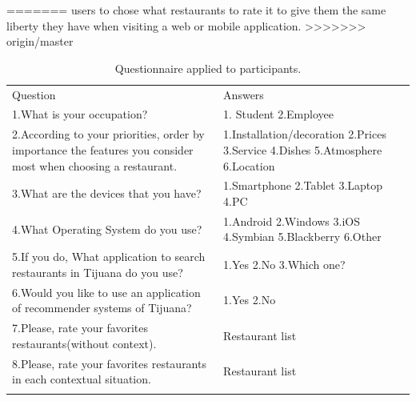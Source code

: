 =======
users to chose what restaurants to rate it to give them the same liberty
they have when visiting a web or mobile application. 
>>>>>>> origin/master
\begin{table}
\small
\captionsetup{font=footnotesize}
\caption{Questionnaire applied to participants.}
\label{tab:questions} 
\centering
\small
\begin{tabular}{p{7cm} p{5cm} }
\hline\noalign{\smallskip}
Question & Answers \\
\noalign{\smallskip}\hline\noalign{\smallskip}
\small{1.What is your occupation?} & \small{1. Student 2.Employee} \\ \hline  
\small{2.According to your priorities, order by importance the features 
you consider most when choosing a restaurant. } & 
\small{1.Installation/decoration 2.Prices 3.Service 4.Dishes 
5.Atmosphere 6.Location}  \\ \hline 
\small{3.What are the devices that you have?}
& \small{1.Smartphone 2.Tablet 3.Laptop 4.PC} \\ \hline   
\small{4.What Operating System do you use?} & 
\small{1.Android 2.Windows 3.iOS 4.Symbian 5.Blackberry 6.Other}
\\ \hline  
\small{5.If you do, What application to search restaurants in Tijuana do you use?} &
\small{1.Yes 2.No 3.Which one?} \\ \hline   
\small{6.Would you like to use an application of
recommender systems of Tijuana?} & \small{1.Yes 2.No} \\ \hline  
\small{7.Please, rate your favorites restaurants(without context).} & 
\small{Restaurant list} \\ \hline
\small{8.Please, rate your favorites restaurants in each contextual situation.} & 
\small{Restaurant list} \\
\noalign{\smallskip}\hline
\end{tabular}
\end{table}

